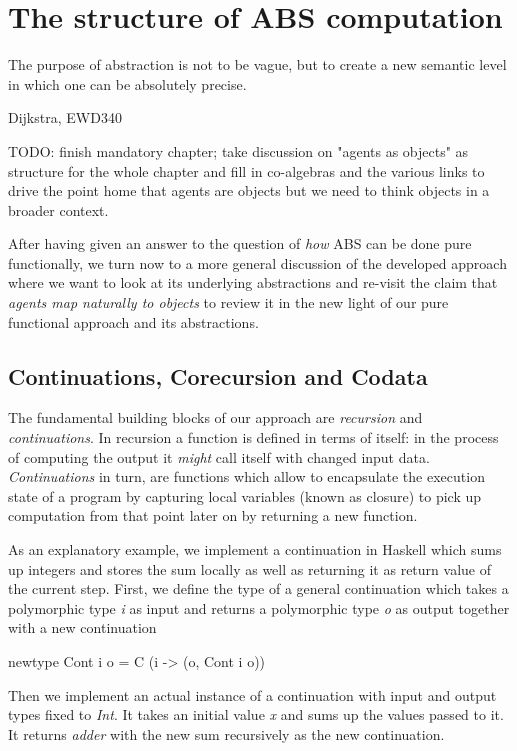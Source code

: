 \chapter{The structure of ABS computation}
\epigraph{The purpose of abstraction is not to be vague, but to create a new semantic level in which one can be absolutely precise.}{Dijkstra, EWD340}
\label{ch:structure_abs_computation}

TODO: finish mandatory chapter; take discussion on "agents as objects" as structure for the whole chapter and fill in co-algebras and the various links to drive the point home that agents are objects but we need to think objects in a broader context.

\medskip

After having given an answer to the question of \textit{how} ABS can be done pure functionally, we turn now to a more general discussion of the developed approach where we want to look at its underlying abstractions and re-visit the claim that \textit{agents map naturally to objects} \cite{north_managing_2007} to review it in the new light of our pure functional approach and its abstractions.

\section{Continuations, Corecursion and Codata}
The fundamental building blocks of our approach are \textit{recursion} and \textit{continuations}. In recursion a function is defined in terms of itself: in the process of computing the output it \textit{might} call itself with changed input data. \textit{Continuations} in turn, are functions which allow to encapsulate the execution state of a program by capturing local variables (known as closure) to pick up computation from that point later on by returning a new function.

As an explanatory example, we implement a continuation in Haskell which sums up integers and stores the sum locally as well as returning it as return value of the current step. First, we define the type of a general continuation which takes a polymorphic type \textit{i} as input and returns a polymorphic type \textit{o} as output together with a new continuation

\begin{HaskellCode}
newtype Cont i o = C (i -> (o, Cont i o))
\end{HaskellCode}

Then we implement an actual instance of a continuation with input and output types fixed to \textit{Int}. It takes an initial value \textit{x} and sums up the values passed to it. It returns \textit{adder} with the new sum recursively as the new continuation.

